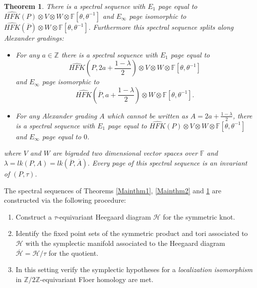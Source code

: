 \documentclass[11pt]{amsart}
\newtheorem{theorem}{Theorem}[section]
\theoremstyle{definition}
\theoremstyle{remark}
\def\F{\mathbb{F}}
\def\Z{\mathbb{Z}}
\def\HFK {\mathit{HFK}}
\newcommand\HFKhat{\widehat{\HFK}}
\numberwithin{equation}{section}
\begin{document}
\begin{theorem}\cite{HendricksDP, Hendricks_2016}\label{HendricksSS}
There is a spectral sequence 
with $E_1$ page equal to $\HFKhat(P)\otimes V\otimes W\otimes \F[\theta,\theta^{-1}]$ and $E_\infty$ page isomorphic to $\HFKhat(\overline{P})\otimes W\otimes  \F[\theta,\theta^{-1}]$. Furthermore this spectral sequence splits along Alexander gradings:
\begin{itemize}
\item For any $a\in \Z$ there is a spectral sequence with $E_1$ page equal to \[\HFKhat(P, 2a+\frac{1-\lambda}{2})\otimes V\otimes W\otimes \F[\theta,\theta^{-1}]\] and $E_\infty$ page isomorphic to \[\HFKhat(\overline{P}, a+\frac{1-\lambda}{2})\otimes W\otimes \F[\theta,\theta^{-1}].\]
\item For any Alexander grading $A$ which cannot be written as $A=2a+\frac{1-\lambda}{2}$, there is a spectral sequence with $E_1$ page equal to $\HFKhat(P)\otimes V\otimes W\otimes \F[\theta,\theta^{-1}]$ and $E_\infty$ page equal to $0$.
\end{itemize}
where $V$ and $W$ are bigraded two dimensional vector spaces over $\F$ and $\lambda=lk(P, A)=lk(\overline{P}, \overline{A}).$ Every page of this spectral sequence is an invariant of $(P,\tau)$.\end{theorem} 
The spectral sequences of Theorems \ref{Mainthm1}, \ref{Mainthm2} and \ref{HendricksSS} are constructed via the following procedure:
\begin{enumerate}
    \item Construct a  $\tau$-equivariant Heegaard diagram $\mathcal{H}$ for the symmetric knot.
    \item Identify the fixed point sets of the symmetric product and tori associated to $\mathcal{H}$ with the symplectic manifold associated to the Heegaard diagram $\overline{\mathcal{H}}=\mathcal{H}/\tau$ for the quotient.
    \item In this setting verify the symplectic hypotheses for a \emph{localization isomorphism} in $\Z/2\Z$-equivariant Floer homology are met.
\end{enumerate}
\end{document}
